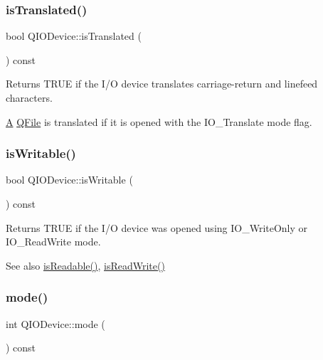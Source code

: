 \subsubsection{\texorpdfstring{isTranslated()}{isTranslated()}}
{\footnotesize\ttfamily bool Q\+I\+O\+Device\+::is\+Translated (\begin{DoxyParamCaption}{ }\end{DoxyParamCaption}) const\hspace{0.3cm}{\ttfamily [inline]}}

Returns T\+R\+UE if the I/O device translates carriage-\/return and linefeed characters.

\mbox{\hyperlink{class_a}{A}} \mbox{\hyperlink{class_q_file}{Q\+File}} is translated if it is opened with the {\ttfamily I\+O\+\_\+\+Translate} mode flag. \mbox{\label{class_q_i_o_device_ab033a6ee76263214267daf8b62ade3c7}} 
\subsubsection{\texorpdfstring{isWritable()}{isWritable()}}
{\footnotesize\ttfamily bool Q\+I\+O\+Device\+::is\+Writable (\begin{DoxyParamCaption}{ }\end{DoxyParamCaption}) const\hspace{0.3cm}{\ttfamily [inline]}}

Returns T\+R\+UE if the I/O device was opened using {\ttfamily I\+O\+\_\+\+Write\+Only} or {\ttfamily I\+O\+\_\+\+Read\+Write} mode. \begin{DoxySeeAlso}{See also}
\mbox{\hyperlink{class_q_i_o_device_a3bba4665b92eabfeca6905e7561cc943}{is\+Readable()}}, \mbox{\hyperlink{class_q_i_o_device_af362cdbc70c8cbd30bcb4aaaf7c8e9e2}{is\+Read\+Write()}} 
\end{DoxySeeAlso}
\mbox{\label{class_q_i_o_device_ad2a025933d4c1fc013f7c7f7ce2601ab}} 
\subsubsection{\texorpdfstring{mode()}{mode()}}
{\footnotesize\ttfamily int Q\+I\+O\+Device\+::mode (\begin{DoxyParamCaption}{ }\end{DoxyParamCaption}) const\hspace{0.3cm}{\ttfamily [inline]}}

